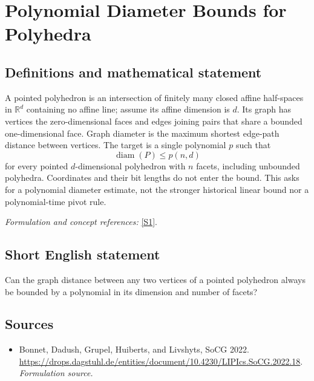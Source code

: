 \documentclass[11pt]{article}
\begin{document}
\section*{\texorpdfstring{Polynomial Diameter Bounds for Polyhedra}{Polynomial Diameter Bounds for Polyhedra}}\label{statement}
\subsection{Definitions and mathematical statement}
A pointed polyhedron is an intersection of finitely many closed affine half-spaces in ${\mathbb{R}}^d$ containing no affine line; assume its affine dimension is $d$. Its graph has vertices the zero-dimensional faces and edges joining pairs that share a bounded one-dimensional face. Graph diameter is the maximum shortest edge-path distance between vertices. The target is a single polynomial $p$ such that
\[
 \operatorname{diam}(P)\le p(n,d)
\]
for every pointed $d$-dimensional polyhedron with $n$ facets, including unbounded polyhedra. Coordinates and their bit lengths do not enter the bound. This asks for a polynomial diameter estimate, not the stronger historical linear bound nor a polynomial-time pivot rule.
\par\smallskip\textit{Formulation and concept references:} \href{https://drops.dagstuhl.de/entities/document/10.4230/LIPIcs.SoCG.2022.18}{[S1]}.

\subsection{Short English statement}
Can the graph distance between any two vertices of a pointed polyhedron always be bounded by a polynomial in its dimension and number of facets?
\subsection{Sources}
\begin{itemize}
\item[S1]Bonnet, Dadush, Grupel, Huiberts, and Livshyts, SoCG 2022.
\url{https://drops.dagstuhl.de/entities/document/10.4230/LIPIcs.SoCG.2022.18}.
\textit{Formulation source.}
\end{itemize}
\end{document}
